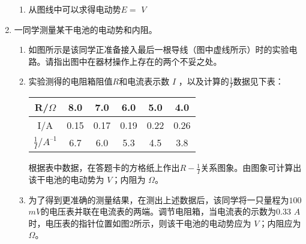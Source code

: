 \begin{enumerate}[leftmargin=0em]
\begin{enumerate}
\item 
从图线中可以求得电动势$ E=$  
$V $	

\end{enumerate}





\newpage
\item 
{}
一同学测量某干电池的电动势和内阻。

\begin{enumerate}
\renewcommand{\labelenumi}{\arabic{enumi}.}
\item
如图所示是该同学正准备接入最后一根导线（图中虚线所示）时的实验电路。请指出图中在器材操作上存在的两个不妥之处。
\begin{figure}[h!]
\centering

\end{figure}

 \hfullline 


\item 
实验测得的电阻箱阻值$ R $和电流表示数 $ I $ ，以及计算的$ \frac{1}{I} $数据见下表：
\begin{table}[h!]
\centering 
\begin{tabular}{|c|c|c|c|c|c|}
\hline 
R/$ \Omega $ & 8.0 & 7.0 & 6.0 & 5.0 & 4.0
\\
\hline
I/A & 0.15 & 0.17 & 0.19 & 0.22 & 0.26
\\
\hline
$ \frac{1}{I}/A^{–1} $ & 6.7 & 6.0 & 5.3 & 4.5 & 3.8\\ 
\hline 
\end{tabular}
\end{table} 

根据表中数据，在答题卡的方格纸上作出$R - \frac { 1 } { I }$关系图象。由图象可计算出该干电池的电动势为  
$ V $；内阻为  
$ \Omega $。
\begin{figure}[h!]
\centering

\end{figure}


\item 
为了得到更准确的测量结果，在测出上述数据后，该同学将一只量程为$ 100 $ $ mV $的电压表并联在电流表的两端。调节电阻箱，当电流表的示数为$ 0.33 $ $ A $时，电压表的指针位置如图$ 2 $所示，则该干电池的电动势应为  
$ V $；内阻应为  
$ \Omega $。




\end{enumerate}
\end{enumerate}
